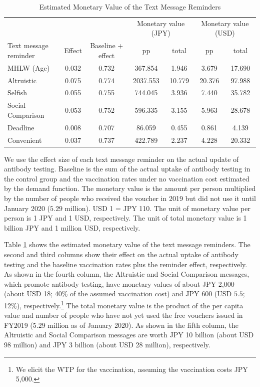 \documentclass[
]{article}
\begin{document}
\begin{table}

\caption{\label{tab:monetary-value}Estimated Monetary Value of the Text Message Reminders}
\centering
\fontsize{9}{11}\selectfont
\begin{threeparttable}
\begin{tabular}[t]{lcccccc}
\toprule
\multicolumn{3}{c}{ } & \multicolumn{2}{c}{Monetary value (JPY)} & \multicolumn{2}{c}{Monetary value (USD)} \\
\cmidrule(l{3pt}r{3pt}){4-5} \cmidrule(l{3pt}r{3pt}){6-7}
Text message reminder & Effect & Baseline + effect & pp & total & pp & total\\
\midrule
MHLW (Age) & 0.032 & 0.732 & 367.854 & 1.946 & 3.679 & 17.690\\
Altruistic & 0.075 & 0.774 & 2037.553 & 10.779 & 20.376 & 97.988\\
Selfish & 0.055 & 0.755 & 744.045 & 3.936 & 7.440 & 35.782\\
Social Comparison & 0.053 & 0.752 & 596.335 & 3.155 & 5.963 & 28.678\\
Deadline & 0.008 & 0.707 & 86.059 & 0.455 & 0.861 & 4.139\\
Convenient & 0.037 & 0.737 & 422.789 & 2.237 & 4.228 & 20.332\\
\bottomrule
\end{tabular}
\begin{tablenotes}
\item We use the effect size of each text message reminder on the actual update of antibody testing. Baseline is the sum of the actual uptake of antibody testing in the control group and the vaccination rates under no vaccination cost estimated by the demand function. The monetary value is the amount per person multiplied by the number of people who received the voucher in 2019 but did not use it until January 2020 ($5.29$ million). USD 1 = JPY 110. The unit of monetary value per person is 1 JPY and 1 USD, respectively. The unit of total monetary value is 1 billion JPY and 1 million USD, respectively.
\end{tablenotes}
\end{threeparttable}
\end{table}

Table \ref{tab:monetary-value} shows the estimated monetary value of the text message reminders. The second and third columns show their effect on the actual uptake of antibody testing and the baseline vaccination rates plus the reminder effect, respectively. As shown in the fourth column, the Altruistic and Social Comparison messages, which promote antibody testing, have monetary values of about JPY 2,000 (about USD 18; 40\% of the assumed vaccination cost) and JPY 600 (USD \(5.5\); 12\%), respectively.\footnote{We elicit the WTP for the vaccination, assuming the vaccination costs JPY 5,000.} The total monetary value is the product of the per capita value and number of people who have not yet used the free vouchers issued in FY2019 (\(5.29\) million as of January 2020). As shown in the fifth column, the Altruistic and Social Comparison messages are worth JPY 10 billion (about USD 98 million) and JPY 3 billion (about USD 28 million), respectively.
\end{document}
